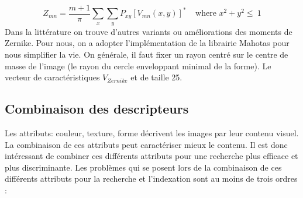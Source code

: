 \begin{equation}
Z_{mn} = \frac{m+1}{\pi} \sum_{x} \sum_{y} P_{xy}[V_{mn}(x,y)]^{*} ~~~~~\mbox{where $x^{2} + y^{2} \leq ~1$}
\end{equation}
Dans la littérature on trouve d'autres variants ou améliorations des moments de Zernike. Pour nous, on a adopter l'implémentation de la librairie Mahotas pour nous simplifier la vie. On générale, il faut fixer un rayon centré sur le centre de masse de l'image (le rayon du cercle enveloppant minimal de la forme).
Le vecteur de caractéristiques $ V_{Zernike} $ et de taille 25.

\subsection{Combinaison des descripteurs}
Les attributs: couleur, texture, forme décrivent les images par leur contenu visuel. La combinaison de ces attributs peut caractériser mieux le contenu. Il est donc intéressant de
combiner ces différents attributs pour une recherche plus efficace et plus discriminante. Les problèmes qui se posent lors de la combinaison de ces différents attributs pour la recherche et l’indexation sont au moins de trois ordres :

